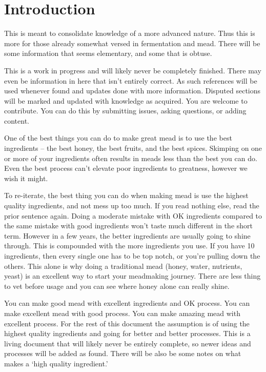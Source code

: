 \section{Introduction}
 This is meant to consolidate knowledge of a more advanced nature. Thus this is more for those already somewhat 
 versed in fermentation and mead. There will be some information that seems elementary, and some that is obtuse.

 This is a work in progress and will likely never be completely finished. There may even be information in
 here that isn't entirely correct. As such references will be used whenever found and updates done with more 
 information. Disputed sections will be marked and updated with knowledge as acquired. You are welcome to 
 contribute. You can do this by submitting issues, asking questions, or adding content.

 One of the best things you can do to make great mead is to use the best ingredients -- the best honey, the best 
 fruits, and the best spices. Skimping on one or more of your ingredients often results in meads less than the 
 best you can do. Even the best process can't elevate poor ingredients to greatness, however we wish it might.

 To re-iterate, the best thing you can do when making mead is use the highest quality ingredients, and not mess
 up too much. If you read nothing else, read the prior sentence again. Doing a moderate mistake with OK ingredients
 compared to the same mistake with good ingredients won't taste much different in the short term. However in a few
 years, the better ingredients are usually going to shine through. This is compounded with the more ingredients you
 use. If you have 10 ingredients, then every single one has to be top notch, or you're pulling down the others.
 This alone is why doing a traditional mead (honey, water, nutrients, yeast) is an excellent way to start your
 meadmaking journey. There are less thing to vet before usage and you can see where honey alone can really shine.

 You can make good mead with excellent ingredients and OK process. You can make excellent mead with good process. You
 can make amazing mead with excellent process. For the rest of this document the assumption is of using the highest
 quality ingredients and going for better and better processes. This is a living document that will likely never 
 be entirely complete, so newer ideas and processes will be added as found.
 There will be also be some notes on what makes a `high quality ingredient.'

 